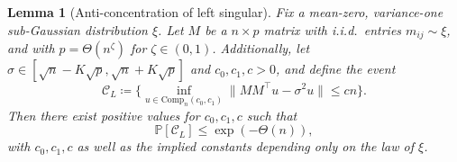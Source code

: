 \documentclass[11pt]{article}
\numberwithin{equation}{section}
\newtheorem{lemma}[theorem]{Lemma}
\theoremstyle{remark}
\newcommand{\Comp}{\mathrm{Comp}}
\begin{document}
\begin{lemma}[Anti-concentration of left singular]\label{lem-incompressible-fixed-val-left}
    Fix a mean-zero, variance-one sub-Gaussian distribution $\xi$. Let $M$ be a $n \times p$ matrix with i.i.d.\ entries $m_{ij} \sim \xi$, and with $p = \Theta(n^{\zeta})$ for $\zeta \in (0, 1)$. Additionally, let $\sigma \in [\sqrt{n} - K\sqrt{p}, \sqrt{n} + K\sqrt{p}]$ and $c_0, c_1, c > 0$, and define the event
    \begin{equation}\label{eq-incompressible-fixed-val-1}
        \mathcal{C}_L \coloneqq \bigg\{ \inf_{u \in \Comp_n(c_0, c_1)}\|M M^\top u - \sigma^2 u\| \leq c n \bigg\}.
    \end{equation}
    Then there exist positive values for $c_0, c_1, c$ such that
    \begin{equation}\label{eq-incompressible-fixed-val-3}
        \mathbb{P}[\mathcal{C}_L] \leq \exp(- \Theta(n)),
    \end{equation}
    with $c_0, c_1, c$ as well as the implied constants depending only on the law of $\xi$.
\end{lemma}
\end{document}
